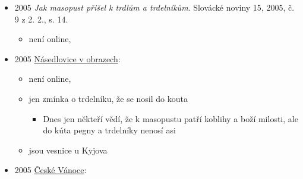 \begin{itemize}
  \begin{itemize}
  \tightlist
  \item
  \item
    s. 28: zabijačkový zvyky, citujou Českou stravu lidovou, na Podluží
    hostům dávají ovarovici, drobky s máčkou kyselou, itrničky se zelím,
    potom trdelníky nebo koblihy
  \item
    s. 59: masopust, popis přípravy trdelníku podle Antonína Václavíka

    \begin{itemize}
    \tightlist
    \item
      válec na ohni, před tím, než se na něj natáčelo těsto, se nahřál.
    \item
      těsto se natáčelo tak, že poslední otočení se muselo přilepit na
      dřívější oviny.
    \item
      při pečení se otáčelo a máčelo mlékem.
    \item
      jakmile se trochu zapeklo, sypalo se strouhaným perníkem a cukrem
      a pak peklo do zlatova
    \item
      po upečení se ovinul kožichem, aby se válec snadno vytáhnul
    \item
      navrch se potíral i medem
    \end{itemize}
  \end{itemize}
\item
  2005  \emph{Jak masopust přišel k trdlům a
  trdelníkům}. Slovácké noviny 15, 2005, č. 9 z 2. 2., s. 14.

  \begin{itemize}
  \tightlist
  \item
    není online, 
  \end{itemize}
\item
  2005
  \href{https://ceskadigitalniknihovna.cz/uuid/uuid:024b8100-ced7-11e3-b110-005056827e51}{Násedlovice
  v obrazech}:

  \begin{itemize}
  \tightlist
  \item
    není online, 
  \item
    jen zmínka o trdelníku, že se nosil do kouta

    \begin{itemize}
    \tightlist
    \item
      Dnes jen někteří vědí, že k masopustu patří koblihy a boží
      milosti, ale do kúta pegny a trdelníky nenosí asi
    \end{itemize}
  \item
     jsou vesnice u Kyjova
  \end{itemize}
\item
  2005
  \href{https://ceskadigitalniknihovna.cz/uuid/uuid:12d02530-5e00-11e5-bf4b-005056827e51}{České
  Vánoce}:


\end{itemize}
